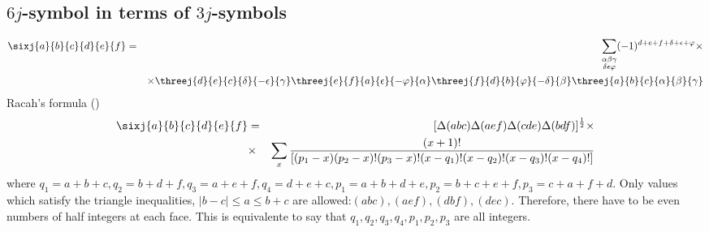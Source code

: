 \documentclass{article}
\begin{document}
\subsection{$6j$-symbol in terms of $3j$-symbols}
\label{sec-6-1}
\begin{eqnarray}
\label{}
\sixj{a}{b}{c}{d}{e}{f} &=& \sum_{\substack{\alpha \beta \gamma \\ \delta \epsilon \varphi}} (-1)^{d+e+f+\delta + \epsilon + \varphi} \times \nonumber\\
& &\times \threej{d}{e}{c}{\delta}{-\epsilon}{\gamma} \threej{e}{f}{a}{\epsilon}{-\varphi}{\alpha} \threej{f}{d}{b}{\varphi}{-\delta}{\beta} \threej{a}{b}{c}{\alpha}{\beta}{\gamma}
\end{eqnarray}
Racah's formula (\cite{Racah})
\begin{eqnarray}
\sixj{a}{b}{c}{d}{e}{f} & = & [\Delta(abc)\Delta(aef)\Delta(cde)\Delta(bdf)]^{\frac{1}{2}} \times \nonumber \\
 & \times & \sum_{x}\frac{(x+1)!}{ [(p_1 -x)(p_2 -x)!(p_3 -x)!(x-q_1)!(x-q_2)!(x-q_3)!(x-q_4)!]} \nonumber\\
\end{eqnarray}
where $q_1 = a+b+c, q_2 = b + d + f, q_3 = a+e+f, q_4 = d+e+c, p_1 = a+b+d+e, p_2 = b+c+e+f, p_3 = c+a+f+d$.
Only values which satisfy the triangle inequalities, $|b-c|\le a \le b+c$ are allowed:$(abc),(aef),(dbf),(dec)$. Therefore, there have to be even numbers of half integers at each face. This is equivalente to say that $q_1, q_2, q_3 , q_4, p_1, p_2, p_3$ are all integers.

\appendix
\end{document}
